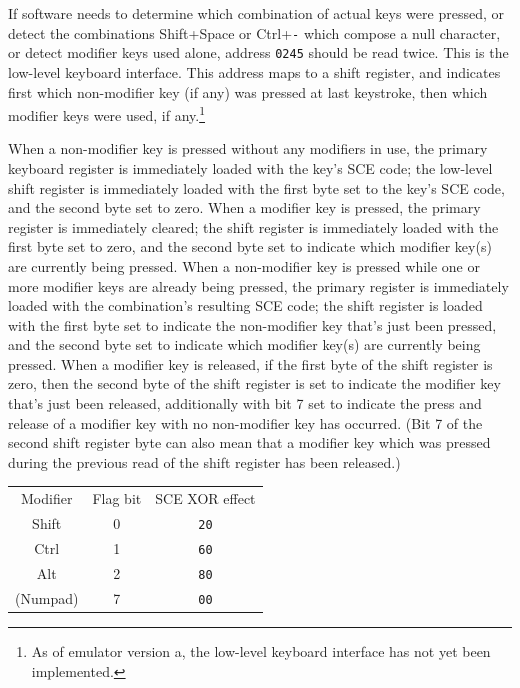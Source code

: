 \documentclass[12pt]{{memoir}}
\begin{document}
If software needs to determine which combination of actual keys were pressed, or detect the combinations \textsf{Shift+Space} or \textsf{Ctrl+}\texttt{-} which compose a null character, or detect modifier keys used alone, address \texttt{0245} should be read twice. This is the low-level keyboard interface. This address maps to a shift register, and indicates first which non-modifier key (if any) was pressed at last keystroke, then which modifier keys were used, if any.\footnote{As of emulator version a, the low-level keyboard interface has not yet been implemented.}

When a non-modifier key is pressed without any modifiers in use, the primary keyboard register is immediately loaded with the key's SCE code; the low-level shift register is immediately loaded with the first byte set to the key's SCE code, and the second byte set to zero. When a modifier key is pressed, the primary register is immediately cleared; the shift register is immediately loaded with the first byte set to zero, and the second byte set to indicate which modifier key(s) are currently being pressed. When a non-modifier key is pressed while one or more modifier keys are already being pressed, the primary register is immediately loaded with the combination's resulting SCE code; the shift register is loaded with the first byte set to indicate the non-modifier key that's just been pressed, and the second byte set to indicate which modifier key(s) are currently being pressed. When a modifier key is released, if the first byte of the shift register is zero, then the second byte of the shift register is set to indicate the modifier key that's just been released, additionally with bit 7 set to indicate the press and release of a modifier key with no non-modifier key has occurred. (Bit 7 of the second shift register byte can also mean that a modifier key which was pressed during the previous read of the shift register has been released.)

\begin{center}\begin{tabular}{ccc}
Modifier & Flag bit & SCE XOR effect \\
\textsf{Shift} & 0 & \texttt{20} \\
\textsf{Ctrl} & 1 & \texttt{60} \\
\textsf{Alt} & 2 & \texttt{80} \\
(Numpad) & 7 & \texttt{00} \\
\end{tabular}\end{center}
\end{document}
